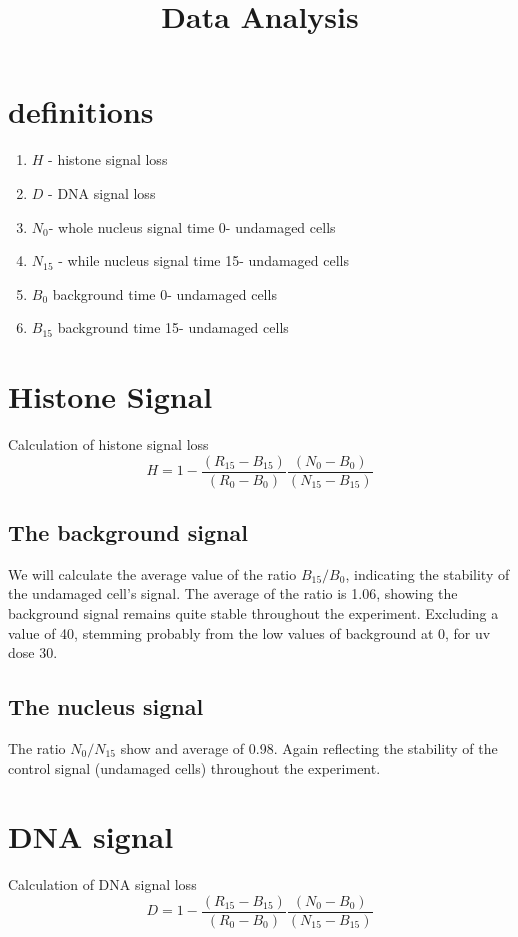 \documentclass[12pt]{article}
\begin{document}
	\title{Data Analysis}
	\maketitle
	\section{definitions}
		\begin{enumerate}
			\item $H$ - histone signal loss
			\item $D$ - DNA signal loss
			\item $N_0$- whole nucleus signal time 0- undamaged cells
			\item $N_{15}$ - while nucleus signal time 15- undamaged cells
			\item $B_0$ background time 0- undamaged cells
			\item $B_{15}$ background time 15- undamaged cells		
		\end{enumerate}
		
	\section{Histone Signal}
		
	Calculation of histone signal loss
	\begin{equation}
	 H = 1-\frac{(R_{15}-B_{15})}{(R_0-B_0)}\frac{(N_0-B_0)}{(N_{15}-B_{15})}
	\end{equation}
	
	\subsection{The background signal}
	We will calculate the average value of the ratio $B_15/B_0$, indicating the stability of the undamaged cell's signal. The average of the ratio is 1.06, showing the background signal remains quite stable throughout the experiment. Excluding a value of 40, stemming probably from the low values of background at 0, for uv dose 30. 
	
	\subsection{The nucleus signal}
	The ratio $N_0/N_{15}$ show and average of 0.98. Again reflecting the stability of the control signal (undamaged cells) throughout the experiment. 
	
	\section{DNA signal}
		Calculation of DNA signal loss
		\begin{equation}
		D = 1-\frac{(R_{15}-B_{15})}{(R_0-B_0)}\frac{(N_0-B_0)}{(N_{15}-B_{15})}
		\end{equation}
\end{document}
